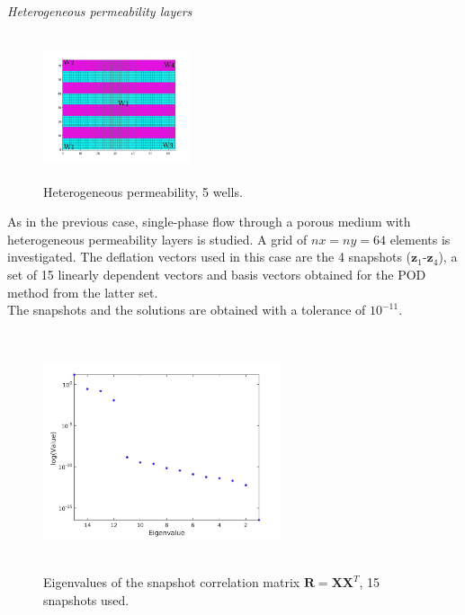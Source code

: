 \documentclass[12pt]{article}
\begin{document}
\emph{Heterogeneous permeability layers}\\

\begin{figure}
\centering 
\vspace{-10pt}
\includegraphics[width=4.3cm,height=4.3cm,keepaspectratio]{perm_he_2.jpg}
 \vspace{-25pt}
\caption{ Heterogeneous permeability, 5 wells.}\label{fig:hep_2}
\vspace{-15pt}
\end{figure} 
As in the previous case, single-phase flow through a porous medium with heterogeneous permeability layers is studied.
A grid of $nx = ny = 64$ elements is investigated. The deflation vectors used in this case are the 4 snapshots ($\mathbf{z}_1$-$\mathbf{z}_4$), a set of 15 linearly dependent vectors and basis vectors obtained for the POD method from the latter set.\\
The snapshots and the solutions are obtained with a tolerance of $10^{-11}$. \\
\begin{figure}[!ht]
\vspace{-20pt}
 \centering
\includegraphics[width=7cm,height=7cm,keepaspectratio]
{eig_pod_5w.jpg}
\vspace{-10pt}
\caption{Eigenvalues of the snapshot correlation matrix $\mathbf{R}=\mathbf{X}\mathbf{X}^T$, 15 snapshots used.}
\vspace{-20pt}
\label{fig:eig}
\end{figure} 
\end{document}
